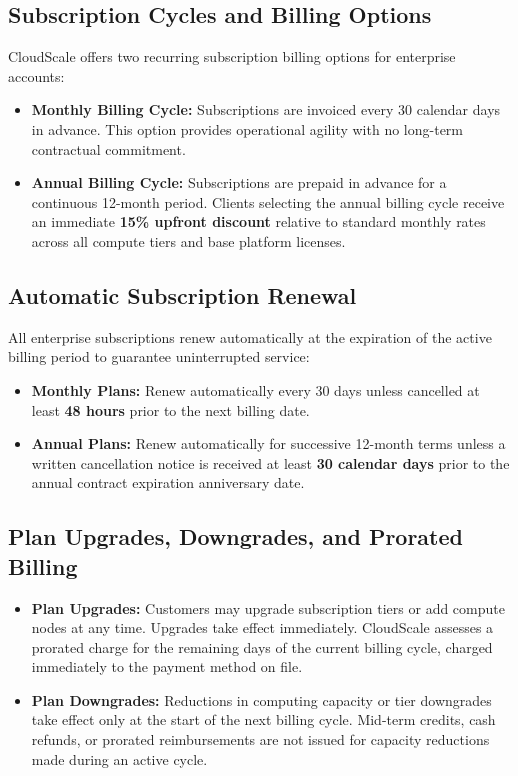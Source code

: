 \documentclass[10pt,letterpaper]{article}
\begin{document}
\subsection{Subscription Cycles and Billing Options}
CloudScale offers two recurring subscription billing options for enterprise accounts:
\begin{itemize}
  \item \textbf{Monthly Billing Cycle:} Subscriptions are invoiced every 30 calendar days in advance. This option provides operational agility with no long-term contractual commitment.
  \item \textbf{Annual Billing Cycle:} Subscriptions are prepaid in advance for a continuous 12-month period. Clients selecting the annual billing cycle receive an immediate \textbf{15\% upfront discount} relative to standard monthly rates across all compute tiers and base platform licenses.
\end{itemize}

\subsection{Automatic Subscription Renewal}
All enterprise subscriptions renew automatically at the expiration of the active billing period to guarantee uninterrupted service:
\begin{itemize}
  \item \textbf{Monthly Plans:} Renew automatically every 30 days unless cancelled at least \textbf{48 hours} prior to the next billing date.
  \item \textbf{Annual Plans:} Renew automatically for successive 12-month terms unless a written cancellation notice is received at least \textbf{30 calendar days} prior to the annual contract expiration anniversary date.
\end{itemize}

\subsection{Plan Upgrades, Downgrades, and Prorated Billing}
\begin{itemize}
  \item \textbf{Plan Upgrades:} Customers may upgrade subscription tiers or add compute nodes at any time. Upgrades take effect immediately. CloudScale assesses a prorated charge for the remaining days of the current billing cycle, charged immediately to the payment method on file.
  \item \textbf{Plan Downgrades:} Reductions in computing capacity or tier downgrades take effect only at the start of the next billing cycle. Mid-term credits, cash refunds, or prorated reimbursements are not issued for capacity reductions made during an active cycle.
\end{itemize}
\end{document}
